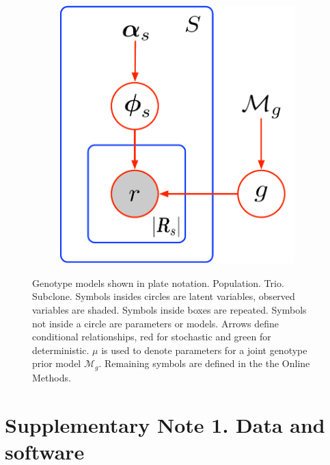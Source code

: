 \documentclass{article}
\begin{document}
\begin{figure}[ht!]
\begin{subfigure}[b]{0.31\textwidth}
        \caption{}
        \label{supfig:trio}
    \end{subfigure}
    \hfill
    \begin{subfigure}[b]{0.31\textwidth}
        \includegraphics[width=\textwidth]{figures/subclone_model}
        \caption{}
        \label{supfig:subclone}
    \end{subfigure}
    \caption{Genotype models shown in plate notation. \textbf{} Population. \textbf{} Trio. \textbf{} Subclone. Symbols insides circles are latent variables, observed variables are shaded. Symbols inside boxes are repeated. Symbols not inside a circle are parameters or models. Arrows define conditional relationships, red for stochastic and green for deterministic. $\mu$ is used to denote parameters for a joint genotype prior model $\mathcal{M}_g$. Remaining symbols are defined in the the Online Methods.}
    \label{fig:genotype-models}
\end{figure}

\clearpage

\section*{Supplementary Note 1. Data and software}
\end{document}
